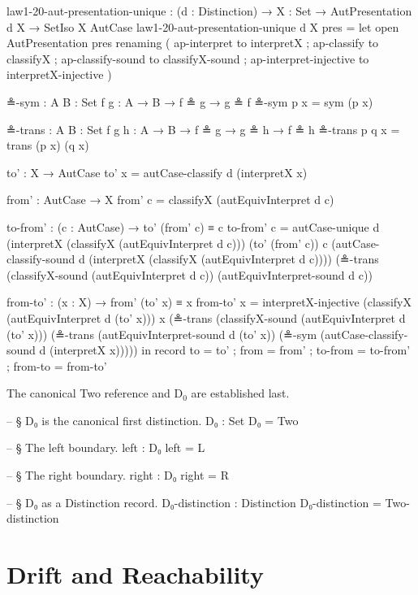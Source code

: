 \documentclass[11pt,a4paper]{book}
\begin{document}
\begin{code}
law1-20-aut-presentation-unique :
  (d : Distinction) →
  {X : Set} →
  AutPresentation d X →
  SetIso X AutCase
law1-20-aut-presentation-unique d {X} pres =
  let
    open AutPresentation pres
      renaming
        ( ap-interpret to interpretX
        ; ap-classify to classifyX
        ; ap-classify-sound to classifyX-sound
        ; ap-interpret-injective to interpretX-injective
        )

    ≗-sym : {A B : Set} {f g : A → B} → f ≗ g → g ≗ f
    ≗-sym p x = sym (p x)

    ≗-trans : {A B : Set} {f g h : A → B} → f ≗ g → g ≗ h → f ≗ h
    ≗-trans p q x = trans (p x) (q x)

    to' : X → AutCase
    to' x = autCase-classify d (interpretX x)

    from' : AutCase → X
    from' c = classifyX (autEquivInterpret d c)

    to-from' : (c : AutCase) → to' (from' c) ≡ c
    to-from' c =
      autCase-unique d (interpretX (classifyX (autEquivInterpret d c)))
        (to' (from' c))
        c
        (autCase-classify-sound d (interpretX (classifyX (autEquivInterpret d c))))
        (≗-trans
          (classifyX-sound (autEquivInterpret d c))
          (autEquivInterpret-sound d c))

    from-to' : (x : X) → from' (to' x) ≡ x
    from-to' x =
      interpretX-injective
        (classifyX (autEquivInterpret d (to' x)))
        x
        (≗-trans
          (classifyX-sound (autEquivInterpret d (to' x)))
          (≗-trans
            (autEquivInterpret-sound d (to' x))
            (≗-sym (autCase-classify-sound d (interpretX x)))))
  in
  record
    { to = to'
    ; from = from'
    ; to-from = to-from'
    ; from-to = from-to'
    }
\end{code}

The canonical Two reference and D$_0$ are established last.

\begin{code}
-- § D₀ is the canonical first distinction.
D₀ : Set
D₀ = Two

-- § The left boundary.
left : D₀
left = L

-- § The right boundary.
right : D₀
right = R

-- § D₀ as a Distinction record.
D₀-distinction : Distinction
D₀-distinction = Two-distinction
\end{code}

\part{Drift and Reachability}
\end{document}
